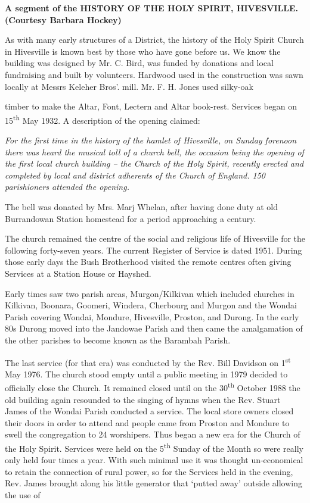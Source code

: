 \textbf{A segment of the HISTORY OF THE HOLY SPIRIT, HIVESVILLE.
(Courtesy Barbara Hockey)}

As with many early structures of a District, the history of the Holy
Spirit Church in Hivesville is known best by those who have gone before
us. We know the building was designed by Mr. C. Bird, was funded by
donations and local fundraising and built by volunteers. Hardwood used
in the construction was sawn locally at Messrs Keleher Bros'. mill. Mr.
F. H. Jones used silky-oak

timber to make the Altar, Font, Lectern and Altar book-rest. Services
began on 15\textsuperscript{th} May 1932. A description of the opening
claimed:

\emph{For the first time in the history of the hamlet of Hivesville, on
Sunday forenoon there was heard the musical toll of a church bell, the
occasion being the opening of the first local church building -- the
Church of the Holy Spirit, recently erected and completed by local and
district adherents of the Church of England. 150 parishioners attended
the opening.}

The bell was donated by Mrs. Marj Whelan, after having done duty at old
Burrandowan Station homestead for a period approaching a century.

The church remained the centre of the social and religious life of
Hivesville for the following forty-seven years. The current Register of
Service is dated 1951. During those early days the Bush Brotherhood
visited the remote centres often giving Services at a Station House or
Hayshed.

Early times saw two parish areas, Murgon/Kilkivan which included
churches in Kilkivan, Boonara, Goomeri, Windera, Cherbourg and Murgon
and the Wondai Parish covering Wondai, Mondure, Hivesville, Proston, and
Durong. In the early 80s Durong moved into the Jandowae Parish and then
came the amalgamation of the other parishes to become known as the
Barambah Parish.

The last service (for that era) was conducted by the Rev. Bill Davidson
on 1\textsuperscript{st} May 1976. The church stood empty until a public
meeting in 1979 decided to officially close the Church. It remained
closed until on the 30\textsuperscript{th} October 1988 the old building
again resounded to the singing of hymns when the Rev. Stuart James of
the Wondai Parish conducted a service. The local store owners closed
their doors in order to attend and people came from Proston and Mondure
to swell the congregation to 24 worshipers. Thus began a new era for the
Church of the Holy Spirit. Services were held on the
5\textsuperscript{th} Sunday of the Month so were really only held four
times a year. With such minimal use it was thought un-economical to
retain the connection of rural power, so for the Services held in the
evening, Rev. James brought along his little generator that `putted
away' outside allowing the use of

